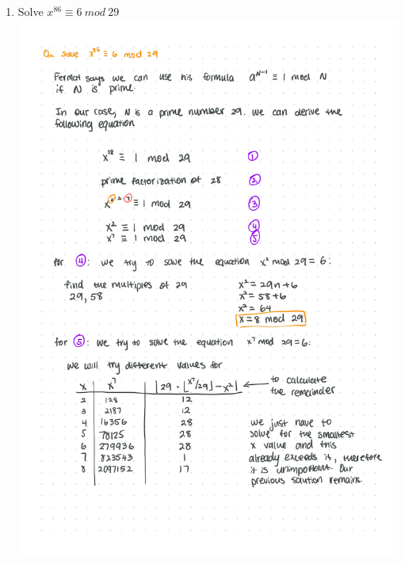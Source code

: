 \documentclass{article}
\begin{document}
    \begin{enumerate}[label=\textbf{Q2}]
        \item Solve $x^{86} \equiv 6\ mod\ 29$\\
        \includegraphics[scale=0.19]{q2.jpeg}
    \end{enumerate}
    \pagebreak
\end{document}
